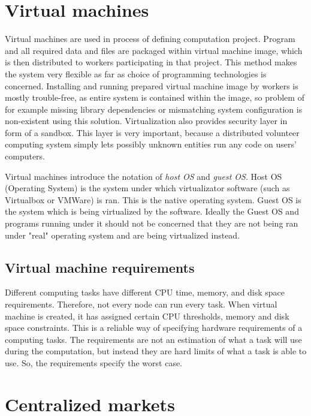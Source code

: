 \section{Virtual machines}
\label{sec:vms}

Virtual machines are used in process of defining computation project. Program and all required data and files are packaged within virtual machine image, which is then distributed to workers participating in that project. This method makes the system very flexible as far as choice of programming technologies is concerned. Installing and running prepared virtual machine image by workers is mostly trouble-free, as entire system is contained within the image, so problem of for example missing library dependencies or mismatching system configuration is non-existent using this solution. Virtualization also provides security layer in form of a sandbox. This layer is very important, because a distributed volunteer computing system simply lets possibly unknown entities run any code on users' computers.

Virtual machines introduce the notation of \emph{host OS} and \emph{guest OS}. Host OS (Operating System) is the system under which virtualizator software (such as Virtualbox or VMWare) is ran. This is the native operating system. Guest OS is the system which is being virtualized by the software. Ideally the Guest OS and programs running under it should not be concerned that they are not being ran under "real" operating system and are being virtualized instead.

\subsection{Virtual machine requirements}

Different computing tasks have different CPU time, memory, and disk space requirements. Therefore, not every node can run every task. When virtual machine is created, it has assigned certain CPU thresholds, memory and disk space constraints. This is a reliable way of specifying hardware requirements of a computing tasks. The requirements are not an estimation of what a task will use during the computation, but instead they are hard limits of what a task is able to use. So, the requirements specify the worst case.

\section{Centralized markets}

